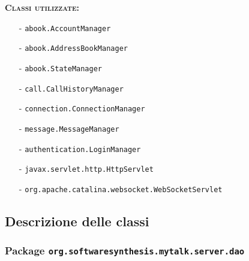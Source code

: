 \begin{description}
	\item{\scshape\bfseries Classi utilizzate:}\\
	\begin{itemize}[noitemsep,nolistsep]
	  \item[-] \texttt{abook.AccountManager}
	  \item[-] \texttt{abook.AddressBookManager}
	  \item[-] \texttt{abook.StateManager}
	  \item[-] \texttt{call.CallHistoryManager}
	  \item[-] \texttt{connection.ConnectionManager}
	  \item[-] \texttt{message.MessageManager}
    \item[-] \texttt{authentication.LoginManager}
	  \item[-] \texttt{javax.servlet.http.HttpServlet}
	  \item[-] \texttt{org.apache.catalina.websocket.WebSocketServlet}
	\end{itemize}
\end{description}

\subsection{Descrizione delle classi}

\subsubsection{Package \texttt{org.softwaresynthesis.mytalk.server.dao}}

